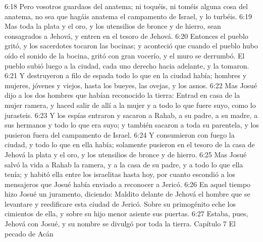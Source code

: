 6:18 Pero vosotros guardaos del anatema; ni toquéis, ni toméis alguna cosa del anatema, no sea que hagáis anatema el campamento de Israel, y lo turbéis.  
6:19 Mas toda la plata y el oro, y los utensilios de bronce y de hierro, sean consagrados a Jehová, y entren en el tesoro de Jehová.  
6:20 Entonces el pueblo gritó, y los sacerdotes tocaron las bocinas; y aconteció que cuando el pueblo hubo oído el sonido de la bocina, gritó con gran vocerío, y el muro se derrumbó. El pueblo subió luego a la ciudad, cada uno derecho hacia adelante, y la tomaron.  
6:21 Y destruyeron a filo de espada todo lo que en la ciudad había; hombres y mujeres, jóvenes y viejos, hasta los bueyes, las ovejas, y los asnos.  
6:22 Mas Josué dijo a los dos hombres que habían reconocido la tierra: Entrad en casa de la mujer ramera, y haced salir de allí a la mujer y a todo lo que fuere suyo, como lo jurasteis.  
6:23 Y los espías entraron y sacaron a Rahab, a su padre, a su madre, a sus hermanos y todo lo que era suyo; y también sacaron a toda su parentela, y los pusieron fuera del campamento de Israel.  
6:24 Y consumieron con fuego la ciudad, y todo lo que en ella había; solamente pusieron en el tesoro de la casa de Jehová la plata y el oro, y los utensilios de bronce y de hierro.  
6:25 Mas Josué salvó la vida a Rahab la ramera, y a la casa de su padre, y a todo lo que ella tenía; y habitó ella entre los israelitas hasta hoy, por cuanto escondió a los mensajeros que Josué había enviado a reconocer a Jericó. 
6:26 En aquel tiempo hizo Josué un juramento, diciendo: Maldito delante de Jehová el hombre que se levantare y reedificare esta ciudad de Jericó. Sobre su primogénito eche los cimientos de ella, y sobre su hijo menor asiente sus puertas. 
6:27 Estaba, pues, Jehová con Josué, y su nombre se divulgó por toda la tierra.  
Capítulo 7 
El pecado de Acán  

